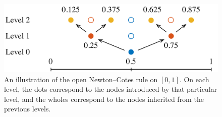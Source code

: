 \begin{figure}[t]
  \centering
  \includegraphics[width=1.0\columnwidth]{include/assets/rule.pdf}
  \caption{
    An illustration of the open Newton--Cotes rule on $[0, 1]$. On each level,
    the dots correspond to the nodes introduced by that particular level, and
    the wholes correspond to the nodes inherited from the previous levels.
  }
\end{figure}
